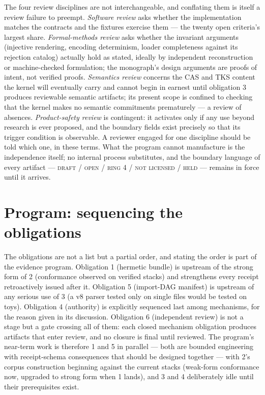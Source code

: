 The four review disciplines are not interchangeable, and conflating them is itself a review failure to preempt. \emph{Software review} asks whether the implementation matches the contracts and the fixtures exercise them --- the twenty open criteria's largest share. \emph{Formal-methods review} asks whether the invariant arguments (injective rendering, encoding determinism, loader completeness against its rejection catalog) actually hold as stated, ideally by independent reconstruction or machine-checked formulation; the monograph's design arguments are proofs of intent, not verified proofs. \emph{Semantics review} concerns the CAS and TKS content the kernel will eventually carry and cannot begin in earnest until obligation 3 produces reviewable semantic artifacts; its present scope is confined to checking that the kernel makes no semantic commitments prematurely --- a review of absences. \emph{Product-safety review} is contingent: it activates only if any use beyond research is ever proposed, and the boundary fields exist precisely so that its trigger condition is observable. A reviewer engaged for one discipline should be told which one, in these terms. What the program cannot manufacture is the independence itself; no internal process substitutes, and the boundary language of every artifact --- \textsc{draft / open / ring 4 / not licensed / held} --- remains in force until it arrives.

\section{Program: sequencing the obligations}\label{evid:program}

The obligations are not a list but a partial order, and stating the order is part of the evidence program. Obligation 1 (hermetic bundle) is upstream of the strong form of 2 (conformance observed on verified stacks) and strengthens every receipt retroactively issued after it. Obligation 5 (import-DAG manifest) is upstream of any serious use of 3 (a v8 parser tested only on single files would be tested on toys). Obligation 4 (authority) is explicitly sequenced last among mechanisms, for the reason given in its discussion. Obligation 6 (independent review) is not a stage but a gate crossing all of them: each closed mechanism obligation produces artifacts that enter review, and no closure is final until reviewed. The program's near-term work is therefore 1 and 5 in parallel --- both are bounded engineering with receipt-schema consequences that should be designed together --- with 2's corpus construction beginning against the current stacks (weak-form conformance now, upgraded to strong form when 1 lands), and 3 and 4 deliberately idle until their prerequisites exist.

